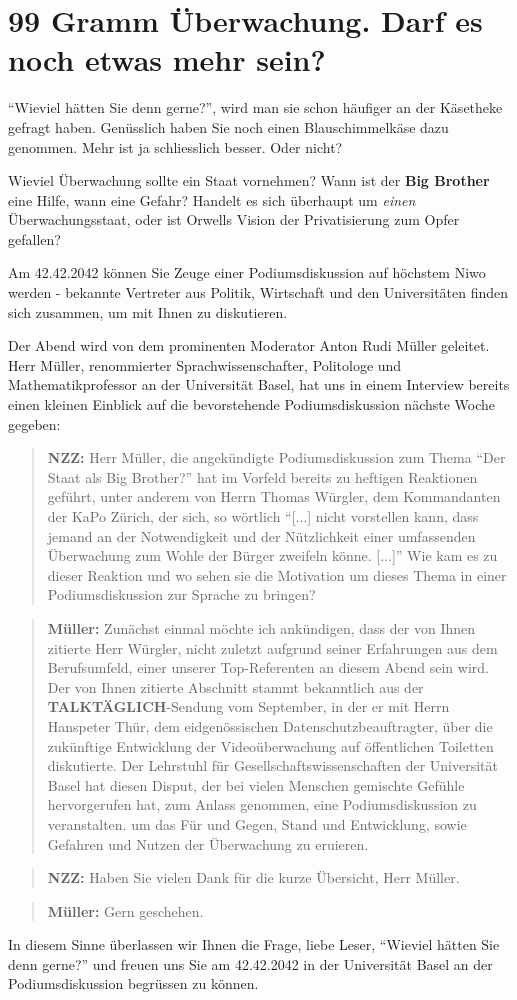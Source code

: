 \documentclass{scrartcl}
\begin{document}
\section*{99 Gramm Überwachung. Darf es noch etwas mehr sein?}
"`Wieviel hätten Sie denn gerne?"', wird man sie schon
häufiger an der Käsetheke gefragt haben. Genüsslich haben
Sie noch einen Blauschimmelkäse dazu genommen. Mehr ist ja
schliesslich besser. Oder nicht?

Wieviel Überwachung sollte ein Staat vornehmen? Wann ist
der \textbf{Big Brother} eine Hilfe, wann eine Gefahr?
Handelt es sich überhaupt um \textit{einen} Überwachungsstaat,
oder ist Orwells Vision der Privatisierung zum Opfer gefallen?

Am 42.42.2042 können Sie Zeuge einer Podiumsdiskussion auf
höchstem Niwo werden - bekannte Vertreter aus Politik, Wirtschaft
und den Universitäten finden sich zusammen, um mit Ihnen
zu diskutieren.

Der Abend wird von dem prominenten Moderator Anton Rudi Müller
geleitet. Herr Müller, renommierter Sprachwissenschafter, Politologe
und Mathematikprofessor an der Universität Basel, hat uns in
einem Interview bereits einen kleinen Einblick auf die 
bevorstehende Podiumsdiskussion nächste Woche gegeben:

\begin{quote}
\textbf{NZZ:} Herr Müller, die angekündigte Podiumsdiskussion zum Thema
"`Der Staat als Big Brother?"' hat im Vorfeld bereits zu
heftigen Reaktionen geführt, unter anderem von Herrn
Thomas Würgler, dem Kommandanten der KaPo Zürich, der
sich, so wörtlich "`[...] nicht vorstellen kann, dass jemand
an der Notwendigkeit und der Nützlichkeit einer umfassenden
Überwachung zum Wohle der Bürger zweifeln könne. [...]"'
Wie kam es zu dieser Reaktion und wo sehen sie die Motivation
um dieses Thema in einer Podiumsdiskussion zur Sprache zu
bringen?
\end{quote}
\begin{quote}
\textbf{Müller:} Zunächst einmal möchte ich ankündigen, dass
der von Ihnen zitierte Herr Würgler, nicht zuletzt aufgrund
seiner Erfahrungen aus dem Berufsumfeld, einer unserer Top-Referenten
an diesem Abend sein wird. Der von Ihnen zitierte Abschnitt stammt
bekanntlich aus der \textbf{TALKTÄGLICH}-Sendung vom September,
in der er mit Herrn Hanspeter Thür,
dem eidgenössischen Datenschutzbeauftragter, über die zukünftige
Entwicklung der Videoüberwachung auf öffentlichen Toiletten
diskutierte. 
Der Lehrstuhl für Gesellschaftswissenschaften der Universität Basel
hat diesen Disput, der bei vielen Menschen gemischte Gefühle
hervorgerufen hat, zum Anlass genommen, eine Podiumsdiskussion
zu veranstalten. um das Für und Gegen, Stand und Entwicklung,
sowie Gefahren und Nutzen der Überwachung zu eruieren.
\end{quote}
\begin{quote}
\textbf{NZZ:} Haben Sie vielen Dank für die kurze Übersicht,
Herr Müller.
\end{quote}
\begin{quote}
\textbf{Müller:} Gern geschehen.
\end{quote}

In diesem Sinne überlassen wir Ihnen die Frage, liebe Leser,
"`Wieviel hätten Sie denn gerne?"' und freuen uns Sie am
42.42.2042 in der Universität Basel an der Podiumsdiskussion
begrüssen zu können.
\end{document}
